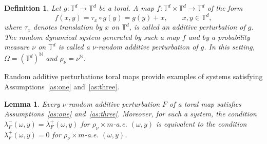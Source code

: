 \documentclass[a4paper,12pt,reqno]{amsart}
\numberwithin{equation}{section}
\newtheorem{lemma}[theorem]{Lemma}
\newtheorem{defn}[theorem]{Definition}
\newcommand{\Nn}{{\mathbb{N}}}
\newcommand{\Tt}{{\mathbb{T}}}
\begin{document}
\begin{defn}
Let $g\colon\Tt^d\to\Tt^d$ be a toral. A map
$f\colon\Tt^d\times\Tt^d\to\Tt^d$ of the form
\[
f(x,y)=\tau_x\circ g(y)=g(y)+x,
\qquad x,y\in\Tt^d,
\]
where $\tau_x$ denotes translation by $x$ on $\Tt^d$, is called an
\emph{additive perturbation} of $g$. The random dynamical system generated by such a map $f$ and by a probability measure $\nu$ on $\Tt^d$ is called a \emph{$\nu$-random additive
perturbation of $g$}. In this setting, $\Omega=(\Tt^d)^{\Nn}$ and $\rho_\nu=\nu^{\Nn}$.
\end{defn}




Random additive perturbations toral maps provide examples of systems satisfying Assumptions~\ref{as:one} and~\ref{as:three}.

\begin{lemma}
\label{le:add-pert}
Every $\nu$-random additive perturbation $F$ of a toral map satisfies Assumptions~\ref{as:one} and~\ref{as:three}. Moreover, for such a system, 
the condition $\lambda_F^-(\omega,y)=\lambda_F^+(\omega,y)$ for $\rho_\nu\times m$-a.e. $(\omega,y)$ is equivalent to the condition $\lambda_F^+(\omega,y)=0$ for $\rho_\nu\times m$-a.e. $(\omega,y)$.
\end{lemma}
\end{document}
